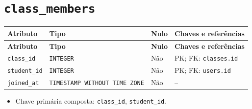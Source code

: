 \section*{\texttt{class\_\allowbreak{}members}}
\begingroup\footnotesize
\setlength{\tabcolsep}{4pt}\renewcommand{\arraystretch}{1.15}
\begin{longtable}{|>{\raggedright\arraybackslash}p{}|>{\raggedright\arraybackslash}p{}|>{\raggedright\arraybackslash}p{}|>{\raggedright\arraybackslash}p{}|}
\hline
\textbf{Atributo} & \textbf{Tipo} & \textbf{Nulo} & \textbf{Chaves e referências} \\ \hline
\endfirsthead
\hline \textbf{Atributo} & \textbf{Tipo} & \textbf{Nulo} & \textbf{Chaves e referências} \\ \hline
\endhead
\texttt{class\_\allowbreak{}id} & \texttt{INTEGER} & Não & PK; FK: \texttt{classes.id} \\ \hline
\texttt{student\_\allowbreak{}id} & \texttt{INTEGER} & Não & PK; FK: \texttt{users.id} \\ \hline
\texttt{joined\_\allowbreak{}at} & \texttt{TIMESTAMP WITHOUT TIME ZONE} & Não & -- \\ \hline
\end{longtable}
\begin{itemize}
\item Chave primária composta: \texttt{class\_\allowbreak{}id}, \texttt{student\_\allowbreak{}id}.
\end{itemize}
\endgroup

